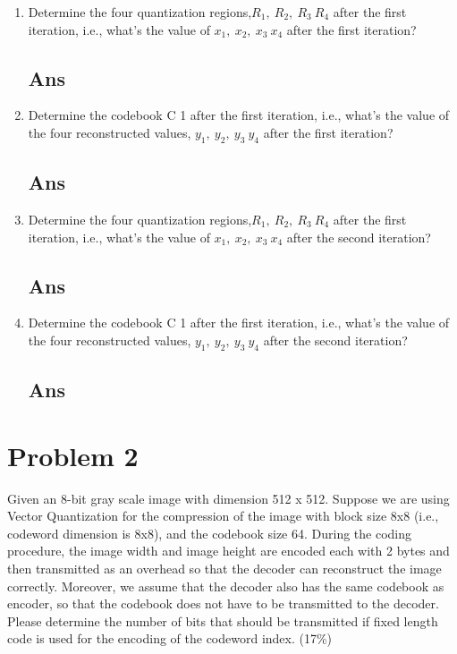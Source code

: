 \documentclass[a4paper, 11pt]{article}
\begin{document}
\begin{enumerate}[label=(\alph*)]
  \item Determine the four quantization regions,$R_{1},~R_{2},~R_{3}~R_{4}$ after 
  the first iteration, i.e., what’s the value of $x_{1},~x_{2},~x_{3}~x_{4}$ after the 
  first iteration?
    \subsection*{Ans}
    
  \item Determine the codebook C 1 after the first iteration, i.e., what’s the value of the
  four reconstructed values, $y_{1},~y_{2},~y_{3}~y_{4}$ after the first iteration?
    \subsection*{Ans}

  \item Determine the four quantization regions,$R_{1},~R_{2},~R_{3}~R_{4}$ after 
  the first iteration, i.e., what’s the value of $x_{1},~x_{2},~x_{3}~x_{4}$ after the 
  second iteration?
    \subsection*{Ans}
  
  \item Determine the codebook C 1 after the first iteration, i.e., what’s the value of the
  four reconstructed values, $y_{1},~y_{2},~y_{3}~y_{4}$ after the second iteration?
    \subsection*{Ans}

\end{enumerate}
\newpage
\section*{Problem 2}
Given an 8-bit gray scale image with dimension 512 x 512. Suppose we are using Vector
Quantization for the compression of the image with block size 8x8 (i.e., codeword
dimension is 8x8), and the codebook size 64. During the coding procedure, the image
width and image height are encoded each with 2 bytes and then transmitted as an
overhead so that the decoder can reconstruct the image correctly. Moreover, we
assume that the decoder also has the same codebook as encoder, so that the codebook does
not have to be transmitted to the decoder.
Please determine the number of bits that should be transmitted if fixed length code is used
for the encoding of the codeword index. (17\%)
\end{document}
